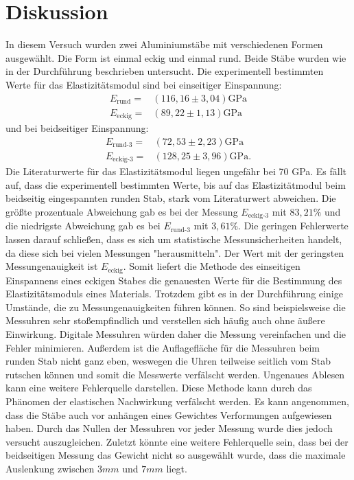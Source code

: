 \section{Diskussion}
\label{sec:Diskussion}
In diesem Versuch wurden zwei Aluminiumstäbe mit verschiedenen Formen ausgewählt.
Die Form ist einmal eckig und einmal rund.
Beide Stäbe wurden wie in der Durchführung beschrieben untersucht.
Die experimentell bestimmten Werte für das Elastizitätsmodul sind bei einseitiger Einspannung:
\begin{align*}
    E_{\text{rund}}=&(116,16\pm3,04)\si{\giga\pascal}\\
    E_{\text{eckig}}=&(89,22\pm1,13)\si{\giga\pascal}
 \end{align*}
und bei beidseitiger Einspannung:
\begin{align*}
    E_{\text{rund-3}}=&(72,53\pm2,23)\si{\giga\pascal}\\
    E_{\text{eckig-3}}=&(128,25\pm3,96)\si{\giga\pascal} \text{.}
 \end{align*}
Die Literaturwerte für das Elastizitätsmodul \cite{Elastizität} liegen ungefähr bei 70 GPa. 
Es fällt auf, dass die experimentell bestimmten Werte, bis auf das Elastizitätmodul beim beidseitig eingespannten runden Stab, stark vom Literaturwert abweichen.
Die größte prozentuale Abweichung gab es bei der Messung $E_{\text{eckig-3}}$ mit $83,21\%$ und die niedrigste Abweichung gab es bei $E_{\text{rund-3}}$ mit $3,61\%$.
Die geringen Fehlerwerte lassen darauf schließen, dass es sich um statistische Messunsicherheiten handelt, da diese sich bei vielen Messungen "herausmitteln".
Der Wert mit der geringsten Messungenauigkeit ist $E_{\text{eckig}}$. 
Somit liefert die Methode des einseitigen Einspannens eines eckigen Stabes die genauesten Werte für die Bestimmung des Elastizitätsmoduls eines Materials.
Trotzdem gibt es in der Durchführung einige Umstände, die zu Messungenauigkeiten führen können.
So sind beispielsweise die Messuhren sehr stoßempfindlich und verstellen sich häufig auch ohne äußere Einwirkung.
Digitale Messuhren würden daher die Messung vereinfachen und die Fehler minimieren.
Außerdem ist die Auflagefläche für die Messuhren beim runden Stab nicht ganz eben, weswegen die Uhren teilweise seitlich vom Stab rutschen können und somit die Messwerte verfälscht werden.
Ungenaues Ablesen kann eine weitere Fehlerquelle darstellen.
Diese Methode kann durch das Phänomen der elastischen Nachwirkung verfälscht werden.
Es kann angenommen, dass die Stäbe auch vor anhängen eines Gewichtes Verformungen aufgewiesen haben.
Durch das Nullen der Messuhren vor jeder Messung wurde dies jedoch versucht auszugleichen.
Zuletzt könnte eine weitere Fehlerquelle sein, dass bei der beidseitigen Messung das Gewicht nicht so ausgewählt wurde, dass die maximale Auslenkung zwischen $3 \unit{mm}$ und $7 \unit{mm}$ liegt.
\pagebreak